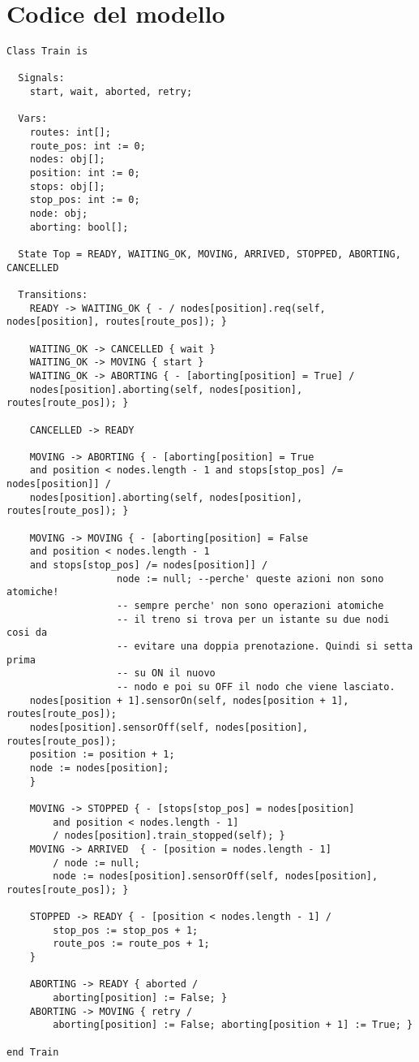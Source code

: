 \chapter{Codice del modello}
\label{cap:code}
\begin{lstlisting}[caption={modello della classe Train}]
Class Train is

  Signals:
    start, wait, aborted, retry;

  Vars:
    routes: int[];
    route_pos: int := 0;
    nodes: obj[];
    position: int := 0;
    stops: obj[];
    stop_pos: int := 0;
    node: obj;
    aborting: bool[];

  State Top = READY, WAITING_OK, MOVING, ARRIVED, STOPPED, ABORTING, CANCELLED

  Transitions:
    READY -> WAITING_OK { - / nodes[position].req(self, nodes[position], routes[route_pos]); }

    WAITING_OK -> CANCELLED { wait }  
    WAITING_OK -> MOVING { start }
    WAITING_OK -> ABORTING { - [aborting[position] = True] / 
    nodes[position].aborting(self, nodes[position], routes[route_pos]); }
    
    CANCELLED -> READY

    MOVING -> ABORTING { - [aborting[position] = True 
    and position < nodes.length - 1 and stops[stop_pos] /= nodes[position]] / 
    nodes[position].aborting(self, nodes[position], routes[route_pos]); }
    
    MOVING -> MOVING { - [aborting[position] = False 
    and position < nodes.length - 1 
    and stops[stop_pos] /= nodes[position]] /                    
                   node := null; --perche' queste azioni non sono atomiche!
                   -- sempre perche' non sono operazioni atomiche
                   -- il treno si trova per un istante su due nodi cosi da
                   -- evitare una doppia prenotazione. Quindi si setta prima 
                   -- su ON il nuovo
                   -- nodo e poi su OFF il nodo che viene lasciato.
    nodes[position + 1].sensorOn(self, nodes[position + 1], routes[route_pos]);
    nodes[position].sensorOff(self, nodes[position], routes[route_pos]);
    position := position + 1;
    node := nodes[position];
    }

    MOVING -> STOPPED { - [stops[stop_pos] = nodes[position] 
    	and position < nodes.length - 1] 
    	/ nodes[position].train_stopped(self); }
    MOVING -> ARRIVED  { - [position = nodes.length - 1] 
    	/ node := null; 
    	node := nodes[position].sensorOff(self, nodes[position], routes[route_pos]); }
    
    STOPPED -> READY { - [position < nodes.length - 1] /
		stop_pos := stop_pos + 1;
        route_pos := route_pos + 1;
    }
    
    ABORTING -> READY { aborted / 
    	aborting[position] := False; }
    ABORTING -> MOVING { retry / 
    	aborting[position] := False; aborting[position + 1] := True; }

end Train
\end{lstlisting}
